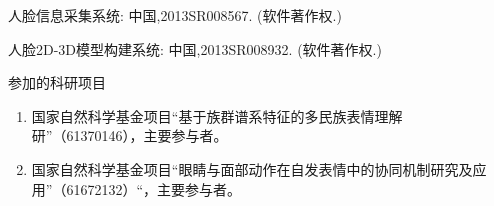 \begin{resume}
\begin{enumerate}[{[}1{]}]
	\end{enumerate}

  \begin{enumerate}[{[}1{]}]
  \item 人脸信息采集系统: 中国,2013SR008567. (软件著作权.)
  \item 人脸2D-3D模型构建系统: 中国,2013SR008932. (软件著作权.)
  \end{enumerate}
  
  
  {\large 参加的科研项目}
\begin{enumerate}
\item 国家自然科学基金项目“基于族群谱系特征的多民族表情理解研”（61370146），主要参与者。

\item 国家自然科学基金项目``眼睛与面部动作在自发表情中的协同机制研究及应用”（61672132）“，主要参与者。
\end{enumerate}

\newpage
\quad

\end{resume}
